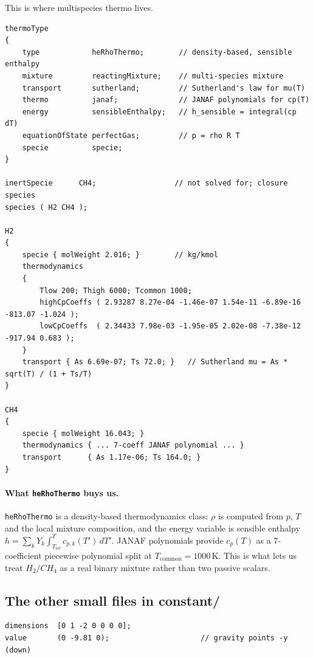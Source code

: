 \documentclass[11pt,a4paper]{article}
\begin{document}
This is where multispecies thermo lives.

\begin{lstlisting}[style=foamstyle,caption={\texttt{constant/thermophysicalProperties} (key parts)}]
thermoType
{
    type            heRhoThermo;        // density-based, sensible enthalpy
    mixture         reactingMixture;    // multi-species mixture
    transport       sutherland;         // Sutherland's law for mu(T)
    thermo          janaf;              // JANAF polynomials for cp(T)
    energy          sensibleEnthalpy;   // h_sensible = integral(cp dT)
    equationOfState perfectGas;         // p = rho R T
    specie          specie;
}

inertSpecie      CH4;                  // not solved for; closure species
species ( H2 CH4 );

H2
{
    specie { molWeight 2.016; }        // kg/kmol
    thermodynamics
    {
        Tlow 200; Thigh 6000; Tcommon 1000;
        highCpCoeffs ( 2.93287 8.27e-04 -1.46e-07 1.54e-11 -6.89e-16 -813.07 -1.024 );
        lowCpCoeffs  ( 2.34433 7.98e-03 -1.95e-05 2.02e-08 -7.38e-12 -917.94 0.683 );
    }
    transport { As 6.69e-07; Ts 72.0; }   // Sutherland mu = As * sqrt(T) / (1 + Ts/T)
}

CH4
{
    specie { molWeight 16.043; }
    thermodynamics { ... 7-coeff JANAF polynomial ... }
    transport      { As 1.17e-06; Ts 164.0; }
}
\end{lstlisting}

\paragraph{What \texttt{heRhoThermo} buys us.}
\texttt{heRhoThermo} is a density-based thermodynamics class:
$\rho$ is computed from $p$, $T$ and the local mixture composition,
and the energy variable is sensible enthalpy
$h = \sum_k Y_k \int_{T_\mathrm{ref}}^{T} c_{p,k}(T') \,dT'$. JANAF
polynomials provide $c_p(T)$ as a 7-coefficient piecewise polynomial
split at $T_\mathrm{common}=1000$\,K. This is what lets us treat
$H_2/CH_4$ as a real binary mixture rather than two passive scalars.

\subsection{The other small files in constant/}

\begin{lstlisting}[style=foamstyle,caption={\texttt{constant/g} (full)}]
dimensions  [0 1 -2 0 0 0 0];
value       (0 -9.81 0);                     // gravity points -y (down)
\end{lstlisting}
\end{document}
